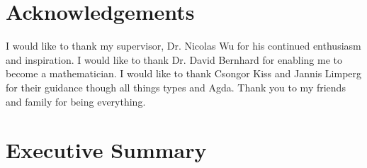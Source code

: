 \documentclass[ %
                author={Alessio Zakaria},
                supervisor={Dr. Nicolas Wu},
                degree={MEng},
                title={Automated Theorem Proving in Category Theory and the
                $\lambda$-calculus},
                subtitle={},
                type={Research},
                year={2019} ]{dissertation}
\begin{document}


\maketitle


\frontmatter

\makedecl


\tableofcontents


\mainmatter

\chapter*{Acknowledgements}
I would like to thank my supervisor, Dr. Nicolas Wu for his continued enthusiasm
and inspiration. I would like to thank Dr. David Bernhard for enabling me to
become a mathematician. I would like to thank Csongor Kiss and Jannis Limperg
for their guidance though all things types and Agda. Thank you to my friends and
family for being everything.
\chapter*{Executive Summary}
\end{document}
